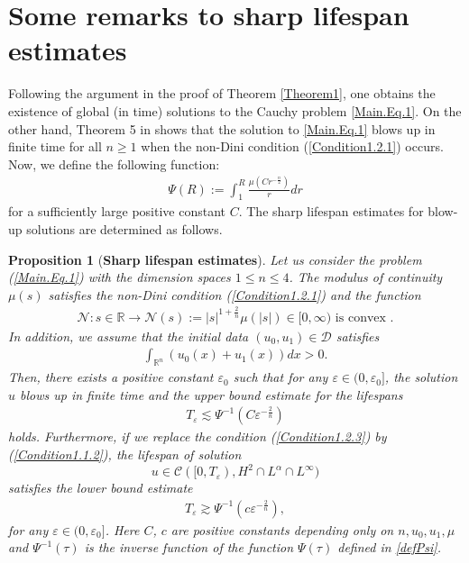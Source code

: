 \documentclass[11pt,reqno]{amsart}
\newtheorem{proposition}{Proposition}[section]
\begin{document}
\section{Some remarks to sharp lifespan  estimates}\label{Lifespan}
Following the argument in the proof of Theorem \ref{Theorem1}, one obtains the existence of  global (in time) solutions to the Cauchy problem \eqref{Main.Eq.1}. On the other hand, Theorem 5 in \cite{EbeGirRei2020} shows that the solution to \eqref{Main.Eq.1} blows up in finite time for all $n \geq 1$ when the non-Dini condition (\ref{Condition1.2.1}) occurs. Now, we define the following function: 
\begin{align}\label{defPsi}
    \Psi(R):=\displaystyle\int_{1}^{R}\frac{\mu\left(Cr^{-\frac{n}{2}}\right)}{r}dr
\end{align}
for a sufficiently large positive constant $C$. The sharp lifespan estimates for blow-up solutions are determined as follows.
\vspace{0.2cm}

\begin{proposition}[\textbf{Sharp lifespan estimates}]\label{Theorem2}
    Let us consider the problem (\ref{Main.Eq.1}) with the dimension spaces $1\leq n\leq 4$. The  modulus of continuity $\mu(s)$ satisfies the non-Dini condition (\ref{Condition1.2.1})     and the function
     \begin{align}\label{Condition1.2.3}
     \mathcal{N}: s \in \mathbb{R} \to \mathcal{N}(s) := |s|^{1+\frac{2}{n}} \mu(|s|) \in [0, \infty) \text{ is convex }.
     \end{align}
     In addition, we assume that the initial data $(u_0,u_1)\in \mathcal{D}$ satisfies
     \begin{align*}
         \int_{\mathbb{R}^n} (u_0(x)+ u_1(x)) dx > 0.
     \end{align*}
     Then, there exists a positive constant $\varepsilon_0$ such that for any $\varepsilon\in (0,\varepsilon_0]$, the solution $u$ blows up in finite time and the upper bound estimate for
the lifespans
\begin{align}
    T_\varepsilon \lesssim \Psi^{-1}\left(C\varepsilon^{-\frac{2}{n}}\right) \label{Upper_lifespan}
\end{align}
holds. Furthermore, if we replace the condition (\ref{Condition1.2.3}) by (\ref{Condition1.1.2}),
      the lifespan of solution $$u \in \mathcal{C}([0, T_\varepsilon), H^2 \cap L^\alpha \cap L^\infty) 
     $$
      satisfies the lower bound estimate
     \begin{align}
         T_{\varepsilon}\gtrsim \Psi^{-1}\left(c\varepsilon^{-\frac{2}{n}}\right), \label{Lower_Lifespan}
     \end{align}
     for any $\varepsilon\in (0,\varepsilon_0]$.
     Here $C$, $c$ are positive constants depending only on $n,u_0,u_1,\mu$ and $\Psi^{-1}(\tau)$ is the inverse function of the function $\Psi(\tau)$ defined in \eqref{defPsi}.
\end{proposition}
\vspace{0.2cm}
\end{document}
